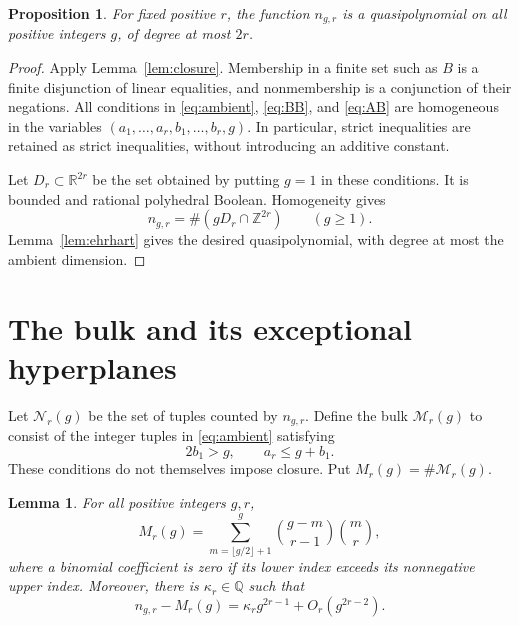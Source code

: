 \documentclass[11pt]{article}
\newtheorem{lemma}[theorem]{Lemma}
\newtheorem{proposition}[theorem]{Proposition}
\theoremstyle{remark}\newtheorem{remark}[theorem]{Remark}
\newcommand{\Z}{\mathbb Z}
\newcommand{\Q}{\mathbb Q}
\newcommand{\R}{\mathbb R}
\begin{document}
\begin{proposition}\label{prop:quasi}
For fixed positive $r$, the function $n_{g,r}$ is a quasipolynomial on all positive integers $g$, of degree at most $2r$.
\end{proposition}

\begin{proof}
Apply Lemma~\ref{lem:closure}. Membership in a finite set such as $B$ is a finite disjunction of linear equalities, and nonmembership is a conjunction of their negations. All conditions in \eqref{eq:ambient}, \eqref{eq:BB}, and \eqref{eq:AB} are homogeneous in the variables $(a_1,\ldots,a_r,b_1,\ldots,b_r,g)$. In particular, strict inequalities are retained as strict inequalities, without introducing an additive constant.

Let $D_r\subset\R^{2r}$ be the set obtained by putting $g=1$ in these conditions. It is bounded and rational polyhedral Boolean. Homogeneity gives
\[
 n_{g,r}=\#(gD_r\cap\Z^{2r})\qquad(g\ge1).
\]
Lemma~\ref{lem:ehrhart} gives the desired quasipolynomial, with degree at most the ambient dimension.
\end{proof}

\section{The bulk and its exceptional hyperplanes}
Let $\mathcal N_r(g)$ be the set of tuples counted by $n_{g,r}$. Define the bulk $\mathcal M_r(g)$ to consist of the integer tuples in \eqref{eq:ambient} satisfying
\begin{equation}\label{eq:bulk}
 2b_1>g,\qquad a_r\le g+b_1.
\end{equation}
These conditions do not themselves impose closure. Put $M_r(g)=\#\mathcal M_r(g)$.

\begin{lemma}\label{lem:bulk}
For all positive integers $g,r$,
\begin{equation}\label{eq:M}
 M_r(g)=\sum_{m=\lfloor g/2\rfloor+1}^{g}
                \binom{g-m}{r-1}\binom{m}{r},
\end{equation}
where a binomial coefficient is zero if its lower index exceeds its nonnegative upper index. Moreover, there is $\kappa_r\in\Q$ such that
\begin{equation}\label{eq:correction}
 n_{g,r}-M_r(g)=\kappa_r g^{2r-1}+O_r(g^{2r-2}).
\end{equation}
\end{lemma}
\end{document}
